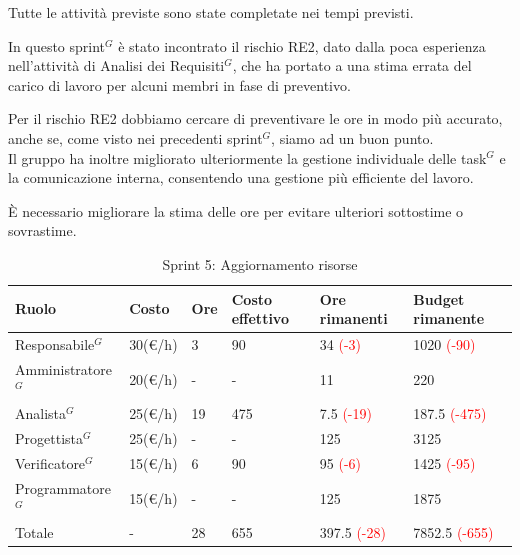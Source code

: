 Tutte le attività previste sono state completate nei tempi previsti.

In questo sprint$^G$ è stato incontrato il rischio RE2, dato dalla poca esperienza nell'attività di Analisi dei Requisiti$^G$, che ha portato a una stima errata del carico di lavoro per alcuni membri in fase di preventivo.

Per il rischio RE2 dobbiamo cercare di preventivare le ore in modo più accurato, anche se, come visto nei precedenti sprint$^G$, siamo ad un buon punto.\\
Il gruppo ha inoltre migliorato ulteriormente la gestione individuale delle task$^G$ e la comunicazione interna, consentendo una gestione più efficiente del lavoro.

È necessario migliorare la stima delle ore per evitare ulteriori sottostime o sovrastime.

\begin{table}[H]
	\centering
	\begin{tabular}{|p{}|p{}|p{}|p{}|p{}|p{}|}
		\hline
		\rowcolor{gray!25}
		Ruolo & Costo & Ore & Costo \newline effettivo & Ore \newline rimanenti & Budget \newline rimanente \\ \hline
		Responsabile$^G$   & 30(€/h) & 3 & 90 & 34 \textcolor{red}{(-3)} & 1020 \textcolor{red}{(-90)} \\ \hline
		Amministratore$^G$ & 20(€/h) & - & - & 11 & 220 \\ \hline
		Analista$^G$       & 25(€/h) & 19 & 475 & 7.5 \textcolor{red}{(-19)} & 187.5 \textcolor{red}{(-475)} \\ \hline
		Progettista$^G$    & 25(€/h) & - & - & 125 & 3125 \\ \hline
		Verificatore$^G$   & 15(€/h) & 6 & 90 & 95 \textcolor{red}{(-6)} & 1425 \textcolor{red}{(-95)} \\ \hline
		Programmatore$^G$  & 15(€/h) & - & - & 125 & 1875 \\ \hline
		Totale         & - & 28 & 655 & 397.5 \textcolor{red}{(-28)} & 7852.5 \textcolor{red}{(-655)} \\ \hline
	\end{tabular}
	\caption{Sprint 5: Aggiornamento risorse}
\end{table}